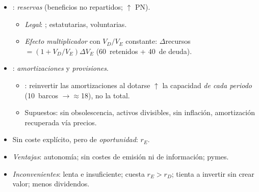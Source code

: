 \documentclass{article}
\begin{document}
\begin{columnas}
\begin{itemize}
\item {}: \emph{reservas} (beneficios no repartidos; $\uparrow$ PN).
  \begin{itemize}
  \item \emph{Legal}: ; estatutarias, voluntarias.
  \item \emph{Efecto multiplicador} con $V_D/V_E$ constante: $\Delta$recursos $=(1+V_D/V_E)\Delta V_E$ (60~retenidos + 40~de deuda).
  \end{itemize}
\item {}: \emph{amortizaciones} y \emph{provisiones}.
  \begin{itemize}
  \item {}: reinvertir las amortizaciones al dotarse $\uparrow$ la capacidad \emph{de cada periodo} (10~barcos $\to\approx$18), no la total.
  \item Supuestos: sin obsolescencia, activos divisibles, sin inflación, amortización recuperada vía precios.
  \end{itemize}
\end{itemize}
\begin{itemize}
\item Sin coste explícito, pero de \emph{oportunidad}: $r_E$.
\item \emph{Ventajas}: autonomía; sin costes de emisión ni de información; pymes.
\item \emph{Inconvenientes}: lenta e insuficiente; cuesta $r_E>r_D$; tienta a invertir sin crear valor; menos dividendos.
\end{itemize}


\end{columnas}
\end{document}
